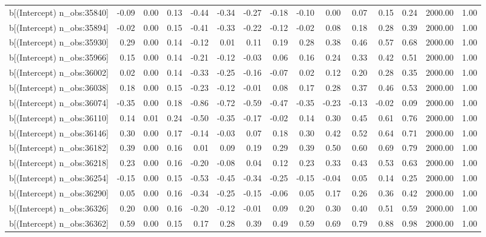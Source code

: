 \begin{table}[ht]
\begin{tabular}{rrrrrrrrrrrrrrr}
  b[(Intercept) n\_obs:35840] & -0.09 & 0.00 & 0.13 & -0.44 & -0.34 & -0.27 & -0.18 & -0.10 & 0.00 & 0.07 & 0.15 & 0.24 & 2000.00 & 1.00 \\ 
  b[(Intercept) n\_obs:35894] & -0.02 & 0.00 & 0.15 & -0.41 & -0.33 & -0.22 & -0.12 & -0.02 & 0.08 & 0.18 & 0.28 & 0.39 & 2000.00 & 1.00 \\ 
  b[(Intercept) n\_obs:35930] & 0.29 & 0.00 & 0.14 & -0.12 & 0.01 & 0.11 & 0.19 & 0.28 & 0.38 & 0.46 & 0.57 & 0.68 & 2000.00 & 1.00 \\ 
  b[(Intercept) n\_obs:35966] & 0.15 & 0.00 & 0.14 & -0.21 & -0.12 & -0.03 & 0.06 & 0.16 & 0.24 & 0.33 & 0.42 & 0.51 & 2000.00 & 1.00 \\ 
  b[(Intercept) n\_obs:36002] & 0.02 & 0.00 & 0.14 & -0.33 & -0.25 & -0.16 & -0.07 & 0.02 & 0.12 & 0.20 & 0.28 & 0.35 & 2000.00 & 1.00 \\ 
  b[(Intercept) n\_obs:36038] & 0.18 & 0.00 & 0.15 & -0.23 & -0.12 & -0.01 & 0.08 & 0.17 & 0.28 & 0.37 & 0.46 & 0.53 & 2000.00 & 1.00 \\ 
  b[(Intercept) n\_obs:36074] & -0.35 & 0.00 & 0.18 & -0.86 & -0.72 & -0.59 & -0.47 & -0.35 & -0.23 & -0.13 & -0.02 & 0.09 & 2000.00 & 1.00 \\ 
  b[(Intercept) n\_obs:36110] & 0.14 & 0.01 & 0.24 & -0.50 & -0.35 & -0.17 & -0.02 & 0.14 & 0.30 & 0.45 & 0.61 & 0.76 & 2000.00 & 1.00 \\ 
  b[(Intercept) n\_obs:36146] & 0.30 & 0.00 & 0.17 & -0.14 & -0.03 & 0.07 & 0.18 & 0.30 & 0.42 & 0.52 & 0.64 & 0.71 & 2000.00 & 1.00 \\ 
  b[(Intercept) n\_obs:36182] & 0.39 & 0.00 & 0.16 & 0.01 & 0.09 & 0.19 & 0.29 & 0.39 & 0.50 & 0.60 & 0.69 & 0.79 & 2000.00 & 1.00 \\ 
  b[(Intercept) n\_obs:36218] & 0.23 & 0.00 & 0.16 & -0.20 & -0.08 & 0.04 & 0.12 & 0.23 & 0.33 & 0.43 & 0.53 & 0.63 & 2000.00 & 1.00 \\ 
  b[(Intercept) n\_obs:36254] & -0.15 & 0.00 & 0.15 & -0.53 & -0.45 & -0.34 & -0.25 & -0.15 & -0.04 & 0.05 & 0.14 & 0.25 & 2000.00 & 1.00 \\ 
  b[(Intercept) n\_obs:36290] & 0.05 & 0.00 & 0.16 & -0.34 & -0.25 & -0.15 & -0.06 & 0.05 & 0.17 & 0.26 & 0.36 & 0.42 & 2000.00 & 1.00 \\ 
  b[(Intercept) n\_obs:36326] & 0.20 & 0.00 & 0.16 & -0.20 & -0.12 & -0.01 & 0.09 & 0.20 & 0.30 & 0.40 & 0.51 & 0.59 & 2000.00 & 1.00 \\ 
  b[(Intercept) n\_obs:36362] & 0.59 & 0.00 & 0.15 & 0.17 & 0.28 & 0.39 & 0.49 & 0.59 & 0.69 & 0.79 & 0.88 & 0.98 & 2000.00 & 1.00 \\ 

\end{tabular}
\end{table}
